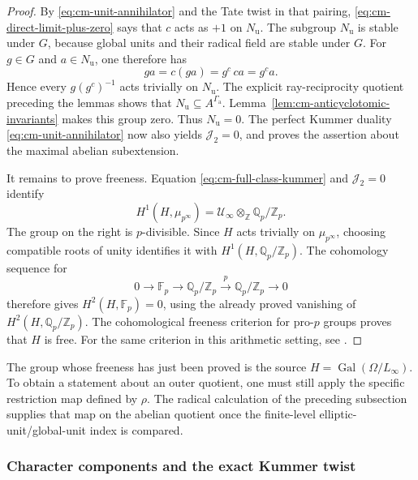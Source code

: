 \begin{proof}
By \eqref{eq:cm-unit-annihilator} and the Tate twist in that
pairing, \eqref{eq:cm-direct-limit-plus-zero} says that \(c\)
acts as \(+1\) on \(N_{\mathrm u}\).
The subgroup \(N_{\mathrm u}\) is stable under \(G\), because
global units and their radical field are stable under \(G\).
For \(g\in G\) and \(a\in N_{\mathrm u}\), one therefore has
\[
                    ga=c(ga)=g^c\,ca=g^c a.
\]
Hence every \(g(g^c)^{-1}\) acts trivially on \(N_{\mathrm u}\).
The explicit ray-reciprocity quotient preceding the lemmas shows
that \(N_{\mathrm u}\subseteq A^{\Gamma_{\mathrm a}}\).
Lemma~\ref{lem:cm-anticyclotomic-invariants} makes this group zero.
Thus \(N_{\mathrm u}=0\).
The perfect Kummer duality
\eqref{eq:cm-unit-annihilator} now also yields
\(\mathcal J_2=0\), and proves the assertion about the maximal
abelian subextension.

It remains to prove freeness.
Equation \eqref{eq:cm-full-class-kummer} and
\(\mathcal J_2=0\) identify
\[
 H^1(H,\mu_{p^\infty})
       =\mathcal U_\infty\otimes_{\mathbb Z}
                                     \mathbb Q_p/\mathbb Z_p.
\]
The group on the right is \(p\)-divisible.
Since \(H\) acts trivially on \(\mu_{p^\infty}\), choosing
compatible roots of unity identifies it with
\(H^1(H,\mathbb Q_p/\mathbb Z_p)\).
The cohomology sequence for
\[
 0\longrightarrow\mathbb F_p
  \longrightarrow\mathbb Q_p/\mathbb Z_p
  \xrightarrow{p}\mathbb Q_p/\mathbb Z_p
  \longrightarrow0
\]
therefore gives \(H^2(H,\mathbb F_p)=0\), using the already
proved vanishing of \(H^2(H,\mathbb Q_p/\mathbb Z_p)\).
The cohomological freeness criterion for pro-\(p\) groups proves
that \(H\) is free.
For the same criterion in this arithmetic setting, see
\cite[Theorem 4.17 and its proof, author version p.~33]
{VenjakobIwasawa}.
\end{proof}

The group whose freeness has just been proved is the
source \(H=\operatorname{Gal}(\Omega/L_\infty)\).
To obtain a statement about an outer quotient, one must still
apply the specific restriction map defined by \(\rho\).
The radical calculation of the preceding subsection supplies
that map on the abelian quotient once the finite-level
elliptic-unit/global-unit index is compared.

\subsubsection{Character components and the exact Kummer twist}

